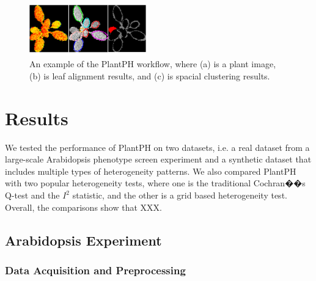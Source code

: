 \documentclass{bioinfo}
\begin{document}
\begin{methods}
%
%
%

\begin{figure}
  \centering
  \includegraphics[width=0.45\textwidth]{workflowexample.png}\vspace{-0.2in}
  \caption{An example of the PlantPH workflow, where (a) is a plant image, (b) is leaf alignment results, and (c) is spacial clustering results.}\label{fig:example}\vspace{-0.2in}
\end{figure}

\end{methods}
\section{Results}

We tested the performance of PlantPH on two datasets, i.e. a real dataset from a large-scale Arabidopsis phenotype screen experiment and a synthetic dataset that includes multiple types of heterogeneity patterns. We also compared PlantPH with two popular heterogeneity tests, where one is the traditional Cochran��s Q-test and the $I^2$ statistic, and the other is a grid based heterogeneity test. Overall, the comparisons show that XXX.

\subsection{Arabidopsis Experiment}

\subsubsection{Data Acquisition and Preprocessing}
\end{document}
